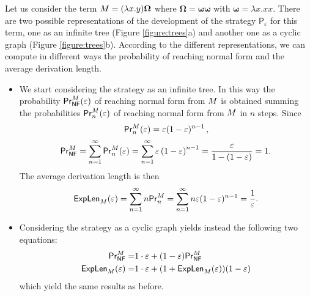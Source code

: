 \begin{example}\label{example:omega}
	Let us consider the term $M=(\lambda x.y)\bm{\Omega}$ where $\bm{\Omega}=\bm{\omega\omega}$  with $\bm{\omega}=\lambda x.xx$. There are two possible representations of the development of the strategy $\mathsf{P}_\varepsilon$ for this term, one as an infinite tree (Figure \ref{figure:trees}a) and another one as a cyclic graph (Figure \ref{figure:trees}b). According to the different representations, we can compute in different ways the probability of reaching normal form and the average derivation length.
	\begin{itemize}
		\item
		We start considering the strategy as an infinite tree. In this way the probability  $\mathsf{Pr}_{\mathsf{NF}}^{M}(\varepsilon)$ of reaching normal form from $M$ is obtained summing the probabilities $\mathsf{Pr}_n^{M}(\varepsilon)$ of reaching normal form from $M$ in $n$ steps. Since
		$$
		\mathsf{Pr}_n^{M}(\varepsilon)=\varepsilon(1-\varepsilon)^{n-1}\,,
		$$
		$$
		\mathsf{Pr}_{\mathsf{NF}}^{M}=\sum_{n=1}^{\infty}\mathsf{Pr}_n^{M}(\varepsilon)=\sum_{n=1}^{\infty}\varepsilon\left( 1-\varepsilon\right)^{n-1}=\frac{\varepsilon}{1-(1-\varepsilon)}=1.
		$$
		The average derivation length is then
		$$
		\textsf{ExpLen}_{M}(\varepsilon)=\sum_{n=1}^{\infty}n\mathsf{Pr}_n^{M}= \sum_{n=1}^{\infty}n\varepsilon(1-\varepsilon)^{n-1}=\frac{1}{\varepsilon}.
		$$
		\item
		Considering the strategy as a cyclic graph yields instead the following two equations:
		\begin{equation*}\begin{split}
				\mathsf{Pr}_{\mathsf{NF}}^{M} =& 1\cdot\varepsilon + (1-\varepsilon)\mathsf{Pr}_{\mathsf{NF}}^{M}\\
				\textsf{ExpLen}_{M}(\varepsilon)=& 1\cdot\varepsilon + (1+\textsf{ExpLen}_{M}(\varepsilon))(1-\varepsilon)
			\end{split}\end{equation*}
			which yield the same results as before.
		\end{itemize}
\end{example}

